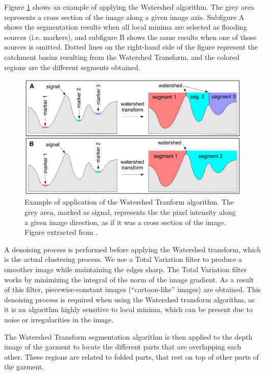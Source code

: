 Figure \ref{fig:watershed_example} shows an example of applying the Watershed algorithm. The grey area represents a cross section of the image along a given image axis. Subfigure A shows the segmentation results when all local minima are selected as flooding sources (i.e. markers), and subfigure B shows the same results when one of those sources is omitted. Dotted lines on the right-hand side of the figure represent the catchment basins resulting from the Watershed Transform, and the colored regions are the different segments obtained.

\begin{figure}[thpb]
    \centering
    \includegraphics[width=\textwidth]
    {figures/watershed-example.png}
    \caption[Example of application of the Watershed Tranform algorithm]
    {Example of application of the Watershed Tranform algorithm. The grey area, marked as signal, represents the the pixel intensity along a given image direction, as if it was a cross section of the image. Figure extracted from \cite{rs6010776}.}
    \label{fig:watershed_example}
\end{figure}

A denoising process is performed before applying the Watershed transform, which is the actual clustering process. We use a Total Variation filter \cite{chambolle2004algorithm} to produce a smoother image while maintaining the edges sharp. The Total Variation filter works by minimizing the integral of the norm of the image gradient. As a result of this filter, piecewise-constant images (``cartoon-like'' images) are obtained. This denoising process is required when using the Watershed transform algorithm, as it is an algorithm highly sensitive to local minima, which can be present due to noise or irregularities in the image. 

The Watershed Transform segmentation algorithm is then applied to the depth image of the garment to locate the different parts that are overlapping each other. These regions are related to folded parts, that rest on top of other parts of the garment. 

